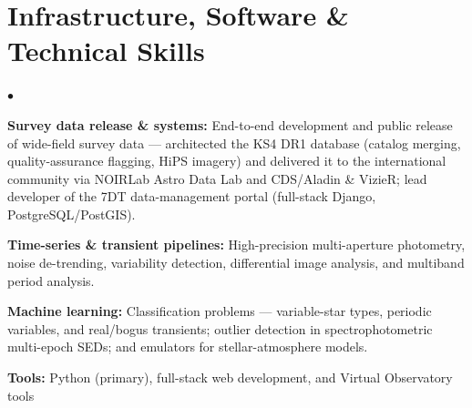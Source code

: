 \documentclass[letterpaper,11pt]{article}
\newenvironment{cvitemize}{
  \begin{list}{$\bullet$}{
    \setlength{\leftmargin}{1.5em}
    \setlength{\itemsep}{0.2em}
    \setlength{\parsep}{0em}
  }
}{
  \end{list}
}
\begin{document}
\section*{Infrastructure, Software \& Technical Skills}
\begin{cvitemize}
\item \textbf{Survey data release \& systems:} End-to-end development and public release of
      wide-field survey data --- architected the KS4 DR1 database (catalog merging,
      quality-assurance flagging, HiPS imagery) and delivered it to the international
      community via NOIRLab Astro Data Lab and CDS/Aladin \& VizieR; lead developer of the 7DT
      data-management portal (full-stack Django, PostgreSQL/PostGIS).
\item \textbf{Time-series \& transient pipelines:} High-precision multi-aperture
      photometry, noise de-trending, variability detection, differential image analysis,
      and multiband period analysis.
\item \textbf{Machine learning:} Classification problems --- variable-star types, periodic
      variables, and real/bogus transients; outlier detection in spectrophotometric
      multi-epoch SEDs; and emulators for stellar-atmosphere models.
\item \textbf{Tools:} Python (primary), full-stack web development, and Virtual Observatory
      tools
\end{cvitemize}

\end{document}
